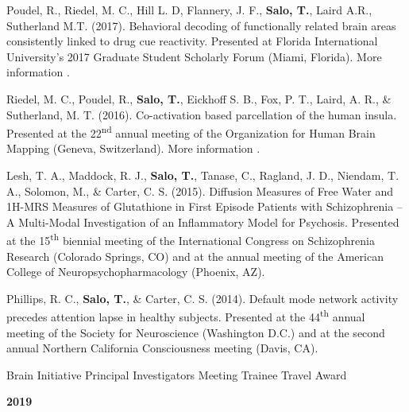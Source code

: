 \documentclass[10pt]{article}
\newcommand{\sectionstyle}{\LARGE \fontfamily{lmr}\selectfont}
\newcommand{\textlink}[3][blue]{\href{#2}{\color{#1}{#3}}}
\begin{document}
\begin{hangparas}{.25in}{1}
	\bigskip

	Poudel, R.,  Riedel, M. C., Hill L. D, Flannery, J. F., \textbf{Salo, T.},
	Laird A.R., Sutherland M.T. (2017).
	Behavioral decoding of functionally related brain areas consistently linked
	to drug cue reactivity.
	Presented at Florida International University's 2017 Graduate Student
	Scholarly Forum (Miami, Florida).
	More information
	\textlink{https://nbclab.github.io/posters/poudel-cue-reactivity-poster}{here}.

	\bigskip

	Riedel, M. C., Poudel, R., \textbf{Salo, T.}, Eickhoff S. B., Fox, P. T.,
	Laird, A. R., \& Sutherland, M. T. (2016).
	Co-activation based parcellation of the human insula.
	Presented at the 22\textsuperscript{nd} annual meeting of the Organization
	for Human Brain Mapping (Geneva, Switzerland).
	More information
	\textlink{https://osf.io/pqvqy}{here}.

	\bigskip

	Lesh, T. A., Maddock, R. J., \textbf{Salo, T.}, Tanase, C., Ragland, J. D.,
	Niendam, T. A., Solomon, M., \& Carter, C. S. (2015).
	Diffusion Measures of Free Water and 1H-MRS Measures of Glutathione in First
	Episode Patients with Schizophrenia -- A Multi-Modal Investigation of an
	Inflammatory Model for Psychosis.
	Presented at the 15\textsuperscript{th} biennial meeting of the International
	Congress on Schizophrenia Research (Colorado Springs, CO) and at
	the annual meeting of the American College of Neuropsychopharmacology
	(Phoenix, AZ).

	\bigskip

	Phillips, R. C., \textbf{Salo, T.}, \& Carter, C. S. (2014).
	Default mode network activity precedes attention lapse in healthy subjects.
	Presented at the 44\textsuperscript{th} annual meeting of the Society for
	Neuroscience (Washington D.C.) and at the second annual Northern California
	Consciousness meeting (Davis, CA).

\end{hangparas}

\bigskip

\begin{center}\sectionstyle{HONORS AND AWARDS}\end{center}

\begin{minipage}[t]{.85\linewidth}
\flushleft
\noindent
Brain Initiative Principal Investigators Meeting Trainee Travel Award
\end{minipage}
\hfill
\begin{minipage}[t]{.15\linewidth}
\flushright
\noindent
\textsc{\textbf{2019}}
\end{minipage}
\end{document}
